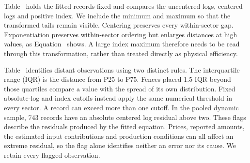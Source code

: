 Table~ holds the fitted records fixed and compares the uncentered logs, centered logs and positive index. We include the minimum and maximum so that the transformed tails remain visible.
Centering preserves every within-sector gap. Exponentiation preserves within-sector ordering but enlarges distances at high values, as Equation~ shows. A large index maximum therefore needs to be read through this transformation, rather than treated directly as physical efficiency.

Table~ identifies distant observations using two distinct rules. The interquartile range (IQR) is the distance from P25 to P75. Fences placed 1.5 IQR beyond those quartiles compare a value with the spread of its own distribution. Fixed absolute-log and index cutoffs instead apply the same numerical threshold in every sector. A record can exceed more than one cutoff.
In the pooled dynamic sample, 743 records have an absolute centered log residual above two. These flags describe the residuals produced by the fitted equation. Prices, reported amounts, the estimated input contributions and production conditions can all affect an extreme residual, so the flag alone identifies neither an error nor its cause. We retain every flagged observation.

